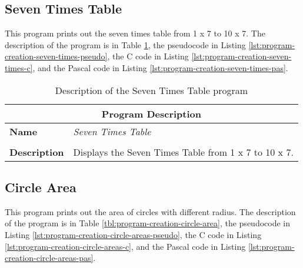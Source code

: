 \subsection{Seven Times Table} %
\label{sub:seven_times_table}

This program prints out the seven times table from 1 x 7 to 10 x 7. The description of the program is in Table \ref{tbl:program-creation-times-table}, the pseudocode in Listing \ref{lst:program-creation-seven-times-pseudo}, the C code in Listing \ref{lst:program-creation-seven-times-c}, and the Pascal code in Listing \ref{lst:program-creation-seven-times-pas}.

\begin{table}[h]
\centering
\begin{tabular}{l|p{10cm}}
  \hline
  \multicolumn{2}{c}{\textbf{Program Description}} \\
  \hline
  \textbf{Name} & \emph{Seven Times Table} \\
  \\
  \textbf{Description} & Displays the Seven Times Table from 1 x 7 to 10 x 7. \\
  \hline
\end{tabular}
\caption{Description of the Seven Times Table program}
\label{tbl:program-creation-times-table}
\end{table}


\clearpage


\clearpage
\subsection{Circle Area} %
\label{sub:circle_area}

This program prints out the area of circles with different radius. The description of the program is in Table \ref{tbl:program-creation-circle-area}, the pseudocode in Listing \ref{lst:program-creation-circle-areas-pseudo}, the C code in Listing \ref{lst:program-creation-circle-areas-c}, and the Pascal code in Listing \ref{lst:program-creation-circle-areas-pas}.

